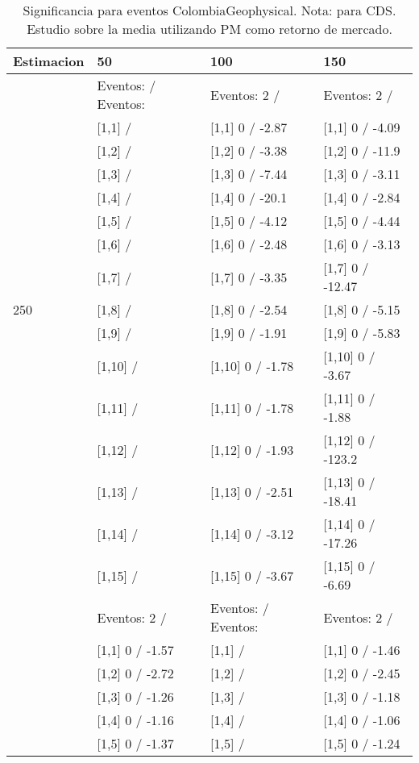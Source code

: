 \begin{table}

\caption{Significancia para eventos ColombiaGeophysical. Nota: para CDS. Estudio sobre la media utilizando PM como retorno de mercado.}
\centering
\begin{tabular}[t]{llll}
\toprule
Estimacion & 50 & 100 & 150\\
\midrule
 & Eventos:   / Eventos: & Eventos:  2 / & Eventos:  2 /\\
 & {}[1,1]  / & {}[1,1] 0  / -2.87 & {}[1,1] 0  / -4.09\\
 & {}[1,2]  / & {}[1,2] 0  / -3.38 & {}[1,2] 0  / -11.9\\
 & {}[1,3]  / & {}[1,3] 0  / -7.44 & {}[1,3] 0  / -3.11\\
 & {}[1,4]  / & {}[1,4] 0  / -20.1 & {}[1,4] 0  / -2.84\\
\addlinespace
 & {}[1,5]  / & {}[1,5] 0  / -4.12 & {}[1,5] 0  / -4.44\\
 & {}[1,6]  / & {}[1,6] 0  / -2.48 & {}[1,6] 0  / -3.13\\
 & {}[1,7]  / & {}[1,7] 0  / -3.35 & {}[1,7] 0  / -12.47\\
250 & {}[1,8]  / & {}[1,8] 0  / -2.54 & {}[1,8] 0  / -5.15\\
 & {}[1,9]  / & {}[1,9] 0  / -1.91 & {}[1,9] 0  / -5.83\\
\addlinespace
 & {}[1,10]  / & {}[1,10] 0  / -1.78 & {}[1,10] 0  / -3.67\\
 & {}[1,11]  / & {}[1,11] 0  / -1.78 & {}[1,11] 0  / -1.88\\
 & {}[1,12]  / & {}[1,12] 0  / -1.93 & {}[1,12] 0  / -123.2\\
 & {}[1,13]  / & {}[1,13] 0  / -2.51 & {}[1,13] 0  / -18.41\\
 & {}[1,14]  / & {}[1,14] 0  / -3.12 & {}[1,14] 0  / -17.26\\
\addlinespace
 & {}[1,15]  / & {}[1,15] 0  / -3.67 & {}[1,15] 0  / -6.69\\
 & Eventos:  2 / & Eventos:   / Eventos: & Eventos:  2 /\\
 & {}[1,1] 0  / -1.57 & {}[1,1]  / & {}[1,1] 0  / -1.46\\
 & {}[1,2] 0  / -2.72 & {}[1,2]  / & {}[1,2] 0  / -2.45\\
 & {}[1,3] 0  / -1.26 & {}[1,3]  / & {}[1,3] 0  / -1.18\\
\addlinespace
 & {}[1,4] 0  / -1.16 & {}[1,4]  / & {}[1,4] 0  / -1.06\\
 & {}[1,5] 0  / -1.37 & {}[1,5]  / & {}[1,5] 0  / -1.24\\

\end{tabular}
\end{table}
